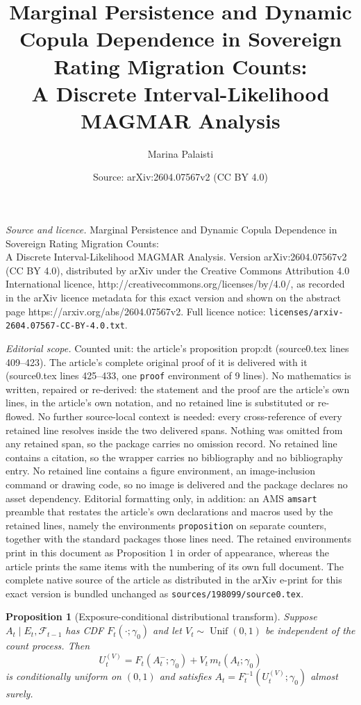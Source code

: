 \documentclass[10pt,a4paper]{amsart}
\title{Marginal Persistence and Dynamic Copula Dependence in Sovereign Rating Migration Counts:\\ A Discrete Interval-Likelihood MAGMAR Analysis}
\author{Marina Palaisti}
\date{Source: arXiv:2604.07567v2 (CC BY 4.0)}
\newtheorem{proposition}{Proposition}
\newcommand{\Unif}{\operatorname{Unif}}
\begin{document}
\maketitle

\noindent\emph{Source and licence.} Marginal Persistence and Dynamic Copula Dependence in Sovereign Rating Migration Counts:\\ A Discrete Interval-Likelihood MAGMAR Analysis. Version arXiv:2604.07567v2 (CC BY 4.0), distributed by arXiv under the Creative Commons Attribution 4.0 International licence, http://creativecommons.org/licenses/by/4.0/, as recorded in the arXiv licence metadata for this exact version and shown on the abstract page https://arxiv.org/abs/2604.07567v2. Full licence notice: \texttt{licenses/arxiv-2604.07567-CC-BY-4.0.txt}.\par\smallskip

\noindent\textit{Editorial scope.} Counted unit: the article's proposition prop:dt (source0.tex lines 409--423). The article's complete original proof of it is delivered with it (source0.tex lines 425--433, one \texttt{proof} environment of 9 lines). No mathematics is written, repaired or re-derived: the statement and the proof are the article's own lines, in the article's own notation, and no retained line is substituted or re-flowed.  No further source-local context is needed: every cross-reference of every retained line resolves inside the two delivered spans.  Nothing was omitted from any retained span, so the package carries no omission record.  No retained line contains a citation, so the wrapper carries no bibliography and no bibliography entry.  No retained line contains a figure environment, an image-inclusion command or drawing code, so no image is delivered and the package declares no asset dependency.  Editorial formatting only, in addition: an AMS \texttt{amsart} preamble that restates the article's own declarations and macros used by the retained lines, namely the environments \texttt{proposition} on separate counters, together with the standard packages those lines need.  The retained environments print in this document as Proposition 1 in order of appearance, whereas the article prints the same items with the numbering of its own full document.  The complete native source of the article as distributed in the arXiv e-print for this exact version is bundled unchanged as \texttt{sources/198099/source0.tex}.
\begin{proposition}[Exposure-conditional distributional transform]
\label{prop:dt}
Suppose $A_t\mid E_t,\mathcal F_{t-1}$ has CDF $F_t(\cdot;\gamma_0)$ and let
$V_t\sim\Unif(0,1)$ be independent of the count process. Then
\begin{equation}
U_t^{(V)}
=
F_t(A_t^-;\gamma_0)
+
V_t\,m_t(A_t;\gamma_0)
\label{eq:randomized-dt}
\end{equation}
is conditionally uniform on $(0,1)$ and satisfies
$A_t=F_t^{-1}(U_t^{(V)};\gamma_0)$ almost surely.
\end{proposition}
\end{document}
